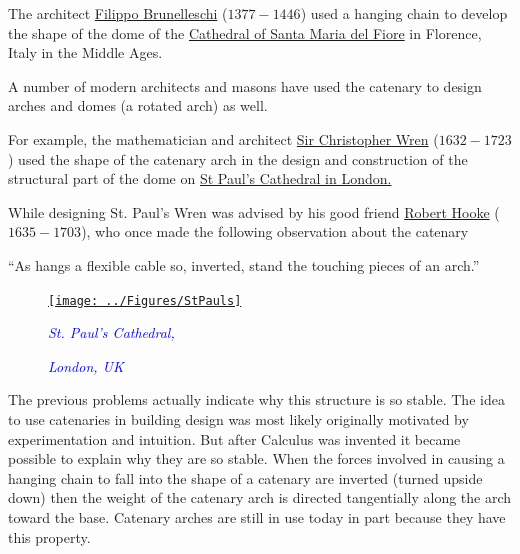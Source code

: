 The
architect
\href{https://www.britannica.com/biography/Filippo-Brunelleschi}{Filippo
  Brunelleschi} ($1377-1446$) used a hanging chain to develop the
shape of the dome of the
\href{http://www.museumsinflorence.com/musei/cathedral_of_florence.html}{Cathedral
  of Santa Maria del Fiore}{} in Florence, Italy in the Middle Ages.

A number of modern architects and masons have used the catenary to design
arches and domes (a rotated
arch) as well.


 For example, the mathematician and architect
 \href{https://mathshistory.st-andrews.ac.uk/Biographies/Wren/}{Sir
   Christopher Wren} ($1632-1723$) used the shape of the catenary arch
 in the  design
 and construction of the structural part of the dome on
 \href{https://en.wikipedia.org/wiki/St_Paul%27s_Cathedral}{St Paul's
   Cathedral in London.}

 While designing St. Paul's Wren was advised by his good friend
 \href{https://mathshistory.st-andrews.ac.uk/Biographies/Hooke/}{Robert
   Hooke} ($1635-1703$), who once made the following  observation about the
 catenary
 \begin{center}
   \begin{minipage}[]{.7\linewidth}
     ``As hangs a flexible cable so, inverted, stand the touching
     pieces of an arch.''
   \end{minipage}
 \end{center}
  
 
  \begin{figure}
    \vskip-3mm{}
    \captionsetup{labelformat=empty}
    \href{https://en.wikipedia.org/wiki/St_Paul%27s_Cathedral}{\texttt{[image: ../Figures/StPauls]}}
    \label{fig:StPauls}
    \textcolor{blue}{\centerline{ {\it{}St. Paul's Cathedral,}}}
          \textcolor{blue}{\centerline{ {\it{}London, UK}}}
 \end{figure}
 The previous problems actually indicate why this structure is so
 stable.   The idea to use catenaries in building design was most likely
  originally motivated by experimentation and intuition. But after
  Calculus was invented it became possible to explain why they are so
  stable.
 When the forces involved in causing a hanging chain to fall
 into the shape of a catenary are inverted (turned upside down) then
 the weight of the catenary arch is directed tangentially along the
 arch toward the base.  Catenary arches are still in use today in part
 because they have this property.

